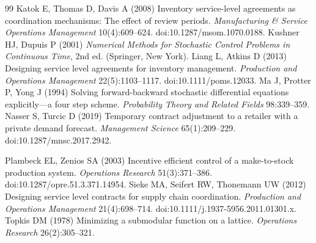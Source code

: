 \begin{thebibliography}{99}
Katok E, Thomas D, Davis A (2008) Inventory service-level agreements as coordination mechanisms: The effect of review periods. \emph{Manufacturing \& Service Operations Management} 10(4):609--624. doi:10.1287/msom.1070.0188.
Kushner HJ, Dupuis P (2001) \emph{Numerical Methods for Stochastic Control Problems in Continuous Time}, 2nd ed. (Springer, New York).
Liang L, Atkins D (2013) Designing service level agreements for inventory management. \emph{Production and Operations Management} 22(5):1103--1117. doi:10.1111/poms.12033.
Ma J, Protter P, Yong J (1994) Solving forward-backward stochastic differential equations explicitly---a four step scheme. \emph{Probability Theory and Related Fields} 98:339--359.
Nasser S, Turcic D (2019) Temporary contract adjustment to a retailer with a private demand forecast. \emph{Management Science} 65(1):209--229. doi:10.1287/mnsc.2017.2942.

Plambeck EL, Zenios SA (2003) Incentive efficient control of a make-to-stock production system. \emph{Operations Research} 51(3):371--386. doi:10.1287/opre.51.3.371.14954.
Sieke MA, Seifert RW, Thonemann UW (2012) Designing service level contracts for supply chain coordination. \emph{Production and Operations Management} 21(4):698--714. doi:10.1111/j.1937-5956.2011.01301.x.
Topkis DM (1978) Minimizing a submodular function on a lattice. \emph{Operations Research} 26(2):305--321.

\end{thebibliography}
